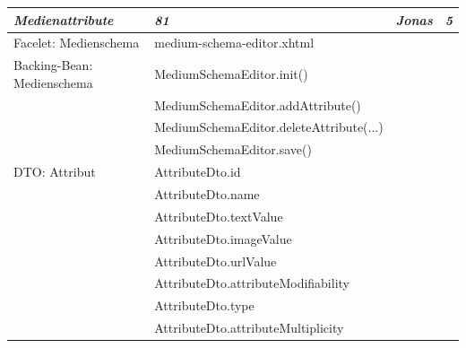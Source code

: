 \documentclass{article}
\begin{document}
\begin{longtable}{|l|l|l|l|}
\hline
\textbf{\textit{Medienattribute}}       & \textbf{\textit{81}}                     & \textbf{\textit{Jonas}}     & \textbf{\textit{5}}    \\ 
\hline
Facelet: Medienschema                   & medium-schema-editor.xhtml               &                             &                        \\ 
\hline
Backing-Bean: Medienschema              & MediumSchemaEditor.init()                &                             &                        \\ 
\hline
                                        & MediumSchemaEditor.addAttribute()        &                             &                        \\ 
\hline
                                        & MediumSchemaEditor.deleteAttribute(...)  &                             &                        \\ 
\hline
                                        & MediumSchemaEditor.save()                &                             &                        \\ 
\hline
DTO: Attribut                           & AttributeDto.id                          &                             &                        \\ 
\hline
                                        & AttributeDto.name                        &                             &                        \\ 
\hline
                                        & AttributeDto.textValue                   &                             &                        \\ 
\hline
                                        & AttributeDto.imageValue                  &                             &                        \\ 
\hline
                                        & AttributeDto.urlValue                    &                             &                        \\ 
\hline
                                        & AttributeDto.attributeModifiability      &                             &                        \\ 
\hline
                                        & AttributeDto.type                        &                             &                        \\ 
\hline
                                        & AttributeDto.attributeMultiplicity       &                             &                        \\ 

\end{longtable}
\end{document}
